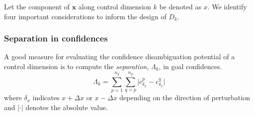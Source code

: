 \documentclass[conference]{IEEEtran}
\begin{document}
Let the component of $\boldsymbol{x}$ along control dimension $k$ be denoted as $x$. 
%
We identify four important considerations to  inform the design of $D_{k}$.

\subsubsection{Separation in confidences}
A good measure for evaluating the confidence disambiguation potential of a control dimension is to compute the \textit{separation}, $\Lambda_{k}$, in goal confidences. 
\begin{equation*}
\Lambda_{k} = \sum_{p=1}^{n_g}\sum_{q=p}^{n_g}\lvert c^{p}_{\delta_x} - c^{q}_{\delta_x}\rvert
\end{equation*}
where $\delta_x$ indicates $x+\Delta x$ or $x-\Delta x$ depending on the direction of perturbation and $\lvert\cdot\rvert$ denotes the absolute value. 
\end{document}
